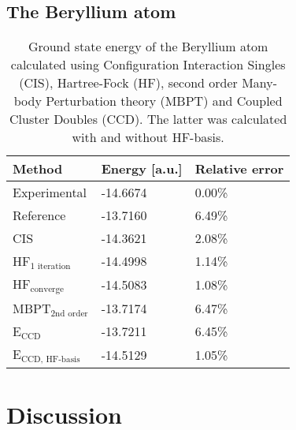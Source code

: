 \documentclass[a4paper,12pt]{article}
\begin{document}
\subsection{The Beryllium atom}
\label{sec:BerylliumResults}
\begin{table} [H]
	\caption{Ground state energy of the Beryllium atom calculated using Configuration Interaction Singles (CIS), Hartree-Fock (HF), second order Many-body Perturbation theory (MBPT) and Coupled Cluster Doubles (CCD). The latter was calculated with and without HF-basis.}
	\begin{tabularx}{\textwidth}{X|X|X} \hline\hline
		\textbf{Method}&\textbf{Energy} [a.u.]&\textbf{Relative error}\\ \hline
		Experimental & -14.6674 & 0.00\%  \\
		Reference & -13.7160 & 6.49\% \\
		CIS & -14.3621 &  2.08\% \\
		HF$_{\text{1 iteration}}$ &  -14.4998 & 1.14\% \\
		HF$_{\text{converge}}$ & -14.5083 & 1.08\% \\
		MBPT$_{\text{2nd order}}$ & -13.7174 & 6.47\% \\
		E$_{\text{CCD}}$ & -13.7211 & 6.45\% \\
		E$_{\text{CCD, HF-basis}}$ & -14.5129 & 1.05\% \\ \hline\hline
	\end{tabularx}
	\label{tab:gs_be}
\end{table}

\section{Discussion}
\label{sec:Discussion}
\end{document}
